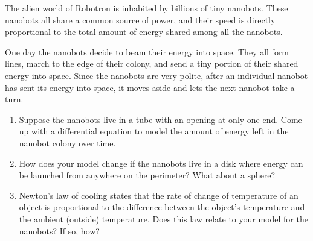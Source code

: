 \begin{exercises}
\begin{problist}
\begin{enumerate}
	\end{enumerate}


	\prob 	The alien world of Robotron is inhabited by billions of tiny nanobots.  These nanobots
	all share a common source of power, and their speed is directly proportional to the
	total amount of energy shared among all the nanobots. 

	One day the nanobots decide to beam their energy into space.  They all form lines,
	march to the edge of their colony, and send a tiny portion of their shared energy into
	space.  Since the nanobots are very polite, after an individual nanobot has sent its energy
	into space, it moves aside and lets the next nanobot take a turn.

	\begin{enumerate}
		\item Suppose the nanobots live in a tube with an opening at only one end.  Come
			up with a differential equation to model the amount of energy left in the nanobot
			colony over time.
		\item How does your model change if the nanobots live in a disk where energy can be launched
			from anywhere on the perimeter?  What about a sphere?
		\item Newton's law of cooling states that the rate of change of temperature of an object is
			proportional to the difference between the object's temperature and the ambient (outside)
			temperature.  Does this law relate to your model for the nanobots?  If so, how?
	\end{enumerate}

	
	\end{problist}
\end{exercises}
